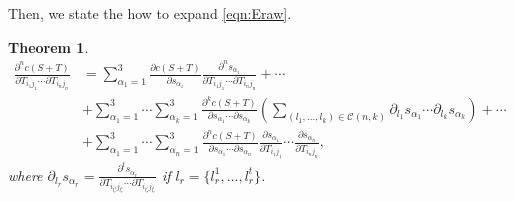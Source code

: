 \documentclass[10pt]{article}
\newtheorem{theorem}{Theorem}
\begin{document}
Then, we state the how to expand \eqref{eqn:Eraw}.
\begin{theorem}
	\begin{align} \label{eqn:EDerivatives}
		\frac{\partial^n c(S+T)}{\partial T_{i_1j_1} \cdots \partial T_{i_nj_n}} &= \sum_{\alpha_1=1}^{3} \frac{\partial c(S+T)}{\partial s_{\alpha_1}} \frac{\partial^n s_{\alpha_1}}{\partial T_{i_1j_1} \cdots \partial T_{i_nj_n}} + \cdots \nonumber \\
		&+ \sum_{\alpha_1=1}^{3}\cdots\sum_{\alpha_k=1}^{3} \frac{\partial^k c(S+T)}{\partial s_{\alpha_1} \cdots \partial s_{\alpha_k}} \left( \sum_{(l_1,\ldots,l_k)\in\mathcal{C}(n,k)} \partial_{l_1}s_{\alpha_1} \cdots \partial_{l_k}s_{\alpha_k} \right) + \cdots \nonumber \\
		&+ \sum_{\alpha_1=1}^{3}\cdots\sum_{\alpha_n=1}^{3} \frac{\partial^n c(S+T)}{\partial s_{\alpha_1}\cdots\partial s_{\alpha_n}} \frac{\partial s_{\alpha_1}}{\partial T_{i_1j_1}} \cdots \frac{\partial s_{\alpha_n}}{\partial T_{i_nj_n}},
	\end{align}
	where $\partial_{l_r}s_{\alpha_r} = \frac{\partial^t s_{\alpha_r}}{\partial T_{i_{l_r^1}j_{l_r^1}} \cdots \partial T_{i_{l_r^t}j_{l_r^t}}}$ if $l_r = \{l_r^1,\ldots,l_r^t\}$.
\end{theorem}
\end{document}
